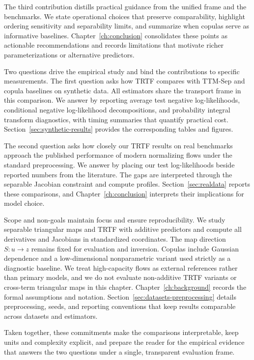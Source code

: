\documentclass[11pt,a4paper,twoside]{book}\usepackage[]{graphicx}\usepackage[]{xcolor}
\begin{document}
The third contribution distills practical guidance from the unified frame and the benchmarks. We state operational choices that preserve comparability, highlight ordering sensitivity and separability limits, and summarize when copulas serve as informative baselines. Chapter~\ref{ch:conclusion} consolidates these points as actionable recommendations and records limitations that motivate richer parameterizations or alternative predictors.

Two questions drive the empirical study and bind the contributions to specific measurements. The first question asks how TRTF compares with TTM-Sep and copula baselines on synthetic data. All estimators share the transport frame in this comparison. We answer by reporting average test negative log-likelihoods, conditional negative log-likelihood decompositions, and probability integral transform diagnostics, with timing summaries that quantify practical cost. Section~\ref{sec:synthetic-results} provides the corresponding tables and figures.

The second question asks how closely our TRTF results on real benchmarks approach the published performance of modern normalizing flows under the standard preprocessing. We answer by placing our test log-likelihoods beside reported numbers from the literature. The gaps are interpreted through the separable Jacobian constraint and compute profiles. Section~\ref{sec:realdata} reports these comparisons, and Chapter~\ref{ch:conclusion} interprets their implications for model choice.

Scope and non-goals maintain focus and ensure reproducibility. We study separable triangular maps and TRTF with additive predictors and compute all derivatives and Jacobians in standardized coordinates. The map direction $S:u \to z$ remains fixed for evaluation and inversion. Copulas include Gaussian dependence and a low-dimensional nonparametric variant used strictly as a diagnostic baseline. We treat high-capacity flows as external references rather than primary models, and we do not evaluate non-additive TRTF variants or cross-term triangular maps in this chapter. Chapter~\ref{ch:background} records the formal assumptions and notation. Section~\ref{sec:datasets-preprocessing} details preprocessing, seeds, and reporting conventions that keep results comparable across datasets and estimators.

Taken together, these commitments make the comparisons interpretable, keep units and complexity explicit, and prepare the reader for the empirical evidence that answers the two questions under a single, transparent evaluation frame.
\end{document}
